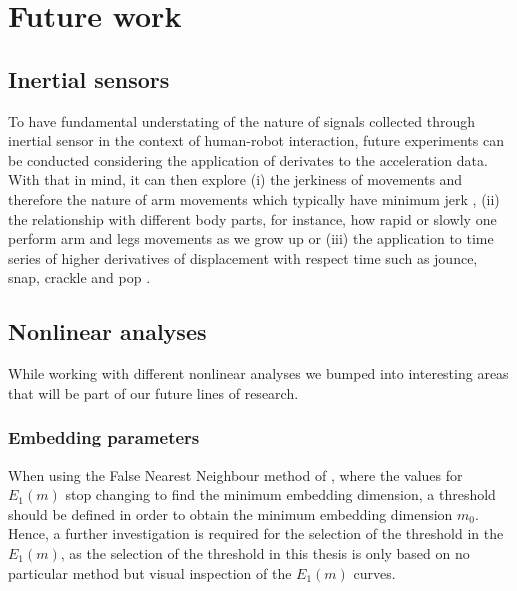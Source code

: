 \section{Future work}

\subsection{Inertial sensors}
To have fundamental understating of the nature of signals collected 
through inertial sensor in the context of human-robot interaction,
future experiments can be conducted considering the application of 
derivates to the acceleration data. 
With that in mind, it can then explore 
(i) the jerkiness of movements and therefore the nature of arm movements 
which typically have minimum jerk \citep{flash1985},
(ii) the relationship with different body parts, for instance, 
how rapid or slowly one perform arm and legs movements as we grow up 
\citep{devries1982, mori2012} or (iii) 
the application to time series of higher derivatives of displacement 
with respect time such as jounce, snap, crackle and pop \citep{eager2016}.

%




\subsection{Nonlinear analyses}
While working with different nonlinear analyses we bumped into 
interesting areas that will be part of our future lines of research.

\subsubsection{Embedding parameters}
When using the False Nearest Neighbour method of \cite{Cao1997}, where 
the values for $E_1(m)$ stop changing to find the minimum embedding 
dimension, a threshold should be defined in order to obtain the minimum 
embedding dimension $m_0$. Hence, a further investigation is required 
for the selection of the threshold in the $E_1(m)$, as the selection 
of the threshold in this thesis is only based on no particular method 
but visual inspection of the $E_1(m)$ curves.

